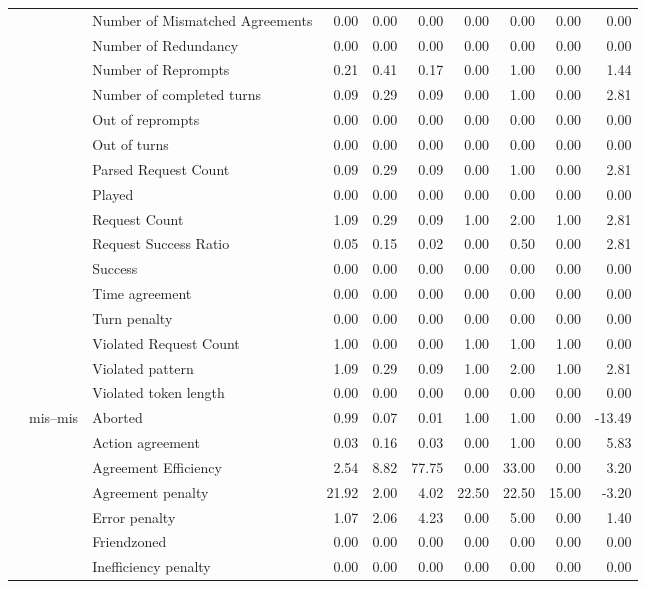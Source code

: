 \begin{tabular}{lllrrrrrrr}
 &  & Number of Mismatched Agreements & 0.00 & 0.00 & 0.00 & 0.00 & 0.00 & 0.00 & 0.00 \\
 &  & Number of Redundancy & 0.00 & 0.00 & 0.00 & 0.00 & 0.00 & 0.00 & 0.00 \\
 &  & Number of Reprompts & 0.21 & 0.41 & 0.17 & 0.00 & 1.00 & 0.00 & 1.44 \\
 &  & Number of completed turns & 0.09 & 0.29 & 0.09 & 0.00 & 1.00 & 0.00 & 2.81 \\
 &  & Out of reprompts & 0.00 & 0.00 & 0.00 & 0.00 & 0.00 & 0.00 & 0.00 \\
 &  & Out of turns & 0.00 & 0.00 & 0.00 & 0.00 & 0.00 & 0.00 & 0.00 \\
 &  & Parsed Request Count & 0.09 & 0.29 & 0.09 & 0.00 & 1.00 & 0.00 & 2.81 \\
 &  & Played & 0.00 & 0.00 & 0.00 & 0.00 & 0.00 & 0.00 & 0.00 \\
 &  & Request Count & 1.09 & 0.29 & 0.09 & 1.00 & 2.00 & 1.00 & 2.81 \\
 &  & Request Success Ratio & 0.05 & 0.15 & 0.02 & 0.00 & 0.50 & 0.00 & 2.81 \\
 &  & Success & 0.00 & 0.00 & 0.00 & 0.00 & 0.00 & 0.00 & 0.00 \\
 &  & Time agreement & 0.00 & 0.00 & 0.00 & 0.00 & 0.00 & 0.00 & 0.00 \\
 &  & Turn penalty & 0.00 & 0.00 & 0.00 & 0.00 & 0.00 & 0.00 & 0.00 \\
 &  & Violated Request Count & 1.00 & 0.00 & 0.00 & 1.00 & 1.00 & 1.00 & 0.00 \\
 &  & Violated pattern & 1.09 & 0.29 & 0.09 & 1.00 & 2.00 & 1.00 & 2.81 \\
 &  & Violated token length & 0.00 & 0.00 & 0.00 & 0.00 & 0.00 & 0.00 & 0.00 \\
\cline{2-10}
 & \multirow[t]{27}{*}{mis--mis} & Aborted & 0.99 & 0.07 & 0.01 & 1.00 & 1.00 & 0.00 & -13.49 \\
 &  & Action agreement & 0.03 & 0.16 & 0.03 & 0.00 & 1.00 & 0.00 & 5.83 \\
 &  & Agreement Efficiency & 2.54 & 8.82 & 77.75 & 0.00 & 33.00 & 0.00 & 3.20 \\
 &  & Agreement penalty & 21.92 & 2.00 & 4.02 & 22.50 & 22.50 & 15.00 & -3.20 \\
 &  & Error penalty & 1.07 & 2.06 & 4.23 & 0.00 & 5.00 & 0.00 & 1.40 \\
 &  & Friendzoned & 0.00 & 0.00 & 0.00 & 0.00 & 0.00 & 0.00 & 0.00 \\
 &  & Inefficiency penalty & 0.00 & 0.00 & 0.00 & 0.00 & 0.00 & 0.00 & 0.00 \\

\end{tabular}
